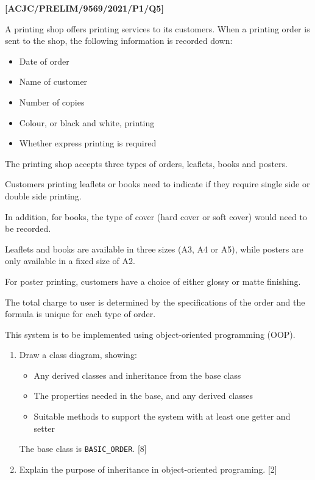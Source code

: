 \item \textbf{{[}ACJC/PRELIM/9569/2021/P1/Q5{]} }

A printing shop offers printing services to its customers. When a
printing order is sent to the shop, the following information is recorded
down:
\begin{itemize}
\item Date of order 
\item Name of customer 
\item Number of copies 
\item Colour, or black and white, printing 
\item Whether express printing is required
\end{itemize}
The printing shop accepts three types of orders, leaflets, books and
posters.

Customers printing leaflets or books need to indicate if they require
single side or double side printing.

In addition, for books, the type of cover (hard cover or soft cover)
would need to be recorded. 

Leaflets and books are available in three sizes (A3, A4 or A5), while
posters are only available in a fixed size of A2.

For poster printing, customers have a choice of either glossy or matte
finishing.

The total charge to user is determined by the specifications of the
order and the formula is unique for each type of order.

This system is to be implemented using object-oriented programming
(OOP).
\begin{enumerate}
\item Draw a class diagram, showing:
\begin{itemize}
\item Any derived classes and inheritance from the base class 
\item The properties needed in the base, and any derived classes 
\item Suitable methods to support the system with at least one getter and
setter
\end{itemize}
The base class is \texttt{BASIC\_ORDER}. \hfill{}{[}8{]}
\item Explain the purpose of inheritance in object-oriented programing.
\hfill{}{[}2{]}
\end{enumerate}